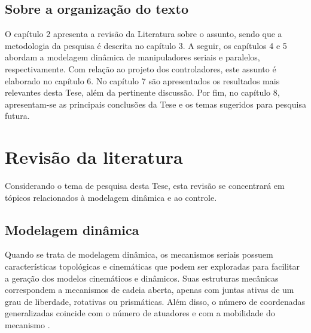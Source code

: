 \documentclass[]{politex}
\begin{document}



\section{Sobre a organização do texto}\label{organizacao}

O capítulo 2 apresenta a revisão da Literatura sobre o assunto, sendo que a metodologia da pesquisa é descrita no capítulo 3. A seguir, os capítulos 4 e 5 abordam a modelagem dinâmica de manipuladores seriais e paralelos, respectivamente. Com relação ao projeto dos controladores, este assunto é elaborado no capítulo 6. No capítulo 7 são apresentados os resultados mais relevantes desta Tese, além da pertinente discussão. Por fim, no capítulo 8, apresentam-se as principais conclusões da Tese e os temas sugeridos para pesquisa futura.

\chapter{Revisão da literatura}\label{revision}

Considerando o tema de pesquisa desta Tese, esta revisão se concentrará em tópicos relacionados à modelagem dinâmica e ao controle.


\section{Modelagem dinâmica}

Quando se trata de modelagem dinâmica, os mecanismos seriais possuem características topológicas e cinemáticas que podem ser exploradas para facilitar a geração dos modelos cinemáticos e dinâmicos. Suas estruturas mecânicas correspondem a mecanismos de cadeia aberta, apenas com juntas ativas de um grau de liberdade, rotativas ou prismáticas. Além disso, o número de coordenadas generalizadas coincide com o número de atuadores e com a mobilidade do mecanismo \cite{Craig}. 
\end{document}
